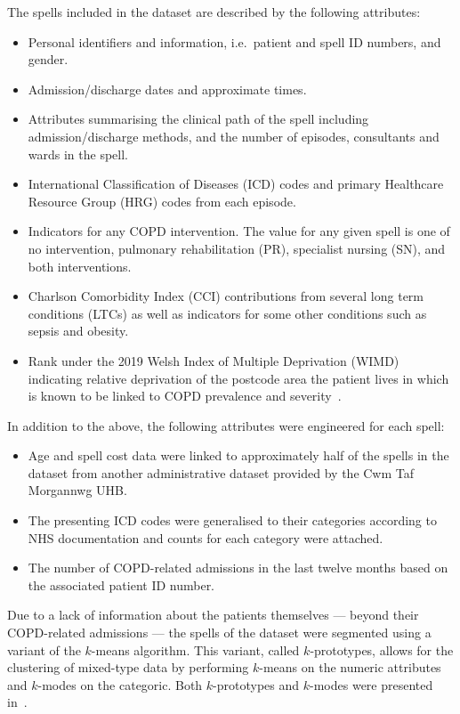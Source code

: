 The spells included in the dataset are described by the following attributes:
\begin{itemize}
    \item Personal identifiers and information, i.e.\ patient and spell ID
        numbers, and gender.
    \item Admission/discharge dates and approximate times.
    \item Attributes summarising the clinical path of the spell including
        admission/discharge methods, and the number of episodes, consultants and
        wards in the spell.
    \item International Classification of Diseases (ICD) codes and primary
        Healthcare Resource Group (HRG) codes from each episode.
    \item Indicators for any COPD intervention. The value for any given spell is
        one of no intervention, pulmonary rehabilitation (PR), specialist
        nursing (SN), and both interventions.
    \item Charlson Comorbidity Index (CCI) contributions from several long term
        conditions (LTCs) as well as indicators for some other conditions such
        as sepsis and obesity.
    \item Rank under the 2019 Welsh Index of Multiple Deprivation (WIMD)
        indicating relative deprivation of the postcode area the patient lives
        in which is known to be linked to COPD prevalence and
        severity~\cite{Collins2018,Sexton2016,Steiner2017}.
\end{itemize}

In addition to the above, the following attributes were engineered for each
spell:
\begin{itemize}
    \item Age and spell cost data were linked to approximately half of the
        spells in the dataset from another administrative dataset provided by
        the Cwm Taf Morgannwg UHB.\
    \item The presenting ICD codes were generalised to their categories
        according to NHS documentation and counts for each category were
        attached.
    \item The number of COPD-related admissions in the last twelve months based
        on the associated patient ID number.
\end{itemize}

Due to a lack of information about the patients themselves --- beyond their
COPD-related admissions --- the spells of the dataset were segmented using a
variant of the \(k\)-means algorithm. This variant, called \(k\)-prototypes,
allows for the clustering of mixed-type data by performing \(k\)-means on the
numeric attributes and \(k\)-modes on the categoric. Both \(k\)-prototypes and
\(k\)-modes were presented in~\cite{Huang1998}.

